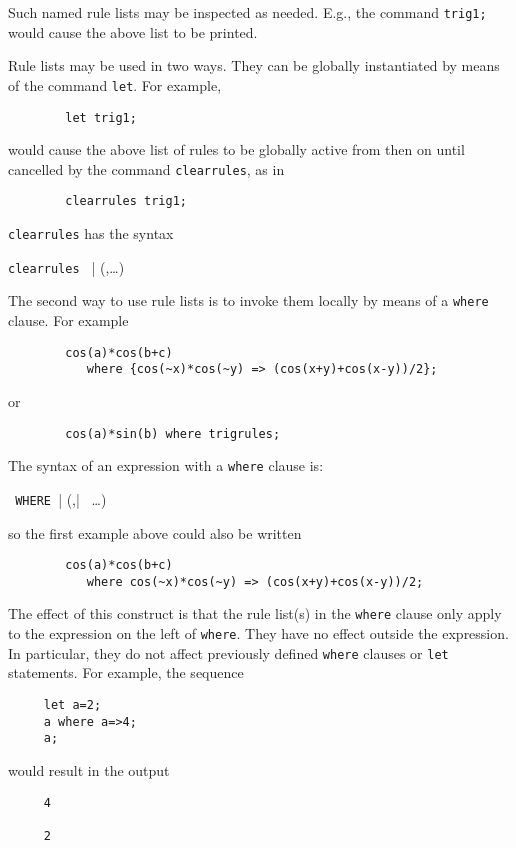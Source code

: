 Such named rule lists may be inspected as needed. E.g., the command
\texttt{trig1;} would cause the above list to be printed.

\hypertarget{CLEARRULES}{}
Rule lists may be used in two ways.  They can be globally instantiated by
means of the command \texttt{let}. For example,
\begin{verbatim}
        let trig1;
\end{verbatim}
would cause the above list of rules to be globally active from then on until
cancelled by the command \texttt{clearrules}, as in
\begin{verbatim}
        clearrules trig1;
\end{verbatim}
\texttt{clearrules} has the syntax
\begin{syntax}
  \texttt{clearrules } | (,\ldots)
\end{syntax}

\hypertarget{operator:WHERE}{}
The second way to use rule lists is to invoke them locally by means of a
\texttt{where} clause.  For example
\begin{verbatim}
        cos(a)*cos(b+c)
           where {cos(~x)*cos(~y) => (cos(x+y)+cos(x-y))/2};
\end{verbatim}
or
\begin{verbatim}
        cos(a)*sin(b) where trigrules;
\end{verbatim}

The syntax of an expression with a \texttt{where} clause is:
\begin{syntax}
  \texttt{ WHERE }| (,| \ \ldots)
\end{syntax}
so the first example above could also be written
\begin{verbatim}
        cos(a)*cos(b+c)
           where cos(~x)*cos(~y) => (cos(x+y)+cos(x-y))/2;
\end{verbatim}

The effect of this construct is that the rule list(s) in the \texttt{where}
clause only apply to the expression on the left of \texttt{where}.  They have
no effect outside the expression.  In particular, they do not affect
previously defined \texttt{where} clauses or \texttt{let} statements.  For
example, the sequence
\begin{verbatim}
     let a=2;
     a where a=>4;
     a;
\end{verbatim}
would result in the output
\begin{verbatim}
     4

     2
\end{verbatim}

